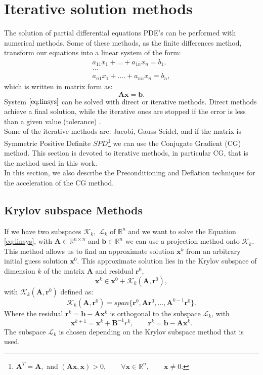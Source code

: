 \documentclass[12pt]{article}
\numberwithin{equation}{section}
\begin{document}
\section{Iterative solution methods}\label{syseq}
The solution of partial differential equations PDE's 
can be performed with numerical methods. Some of these methods, as the finite differences method, 
transform our equations into a linear 
system of the form:
\begin{gather*}
a_{11}x_{1}+\dots+a_{1n}x_{n}=b_{1},\\
\dots\\
a_{n1}x_{1}+....+a_{nn}x_{n}=b_{n},
\end{gather*}
which is written in matrix form as:
\begin{equation}\label{eq:linsys}
 \mathbf{A}\mathbf{x}=\mathbf{b}.
\end{equation}
System $\eqref{eq:linsys}$ can be solved with direct or iterative methods. Direct methods achieve a final solution, 
while the iterative ones
are stopped if the error is less than a given value (tolerance) \cite{Saad03}. \\
Some of the iterative methods are: Jacobi, Gauss Seidel, and if the
matrix is Symmetric Positive Definite $SPD$\footnote{$\mathbf{A}^T=\mathbf{A},$ and $(\mathbf{A}\mathbf{x},\mathbf{x})>0, \qquad \forall \mathbf{x} \in \mathbb{R}^n, \qquad \mathbf{x}\neq0.$} we can use the Conjugate Gradient (CG) method.
This section is devoted to iterative methods, in particular CG, that is the
method used in this work. \\
In this section, we also describe the Preconditioning and Deflation techniques 
for the acceleration of the CG method.
\subsection{Krylov subspace Methods}
If we have two subspaces $\mathcal{K}_k,$ $\mathcal{L}_k$ of $\mathbb{R}^n$ and we want to solve 
the Equation \eqref{eq:linsys}, 
with $\mathbf{A} \in \mathbb{R}^{n\times n}$ and $\mathbf{b} \in \mathbb{R}^{n}$ we can use a projection method onto $\mathcal{K}_k$.
This method allows us to find an approximate solution $\mathbf{x}^k$ from an arbitrary initial guess 
solution $\mathbf{x}^0$. This approximate solution lies in the Krylov subspace of dimension $k$ of the matrix $\mathbf{A}$ 
and residual $\mathbf{r}^0$,
\begin{equation*}
\mathbf{x}^k \in \mathbf{x}^0+\mathcal{K}_k(\mathbf{A},\mathbf{r}^0),
\end{equation*}
with $\mathcal{K}_k(\mathbf{A},\mathbf{r}^0)$ defined as:
\begin{equation*}
\mathcal{K}_k(\mathbf{A},\mathbf{r}^0)=span\{\mathbf{r}^0,\mathbf{A}\mathbf{r}^0,\dots,\mathbf{A}^{k-1}\mathbf{r}^0\}.
\end{equation*}
Where the residual $\mathbf{r}^k=\mathbf{b}-\mathbf{A}\mathbf{x}^k$ is orthogonal to the subspace $\mathcal{L}_k$, with 
\begin{equation*}
 \mathbf{x}^{k+1}=\mathbf{x}^k+\mathbf{B}^{-1}r^k, \qquad \mathbf{r}^k=\mathbf{b}-\mathbf{A}\mathbf{x}^k.
\end{equation*}
The subspace $\mathcal{L}_k$ is chosen depending on the Krylov subspace method that is used.
\end{document}
